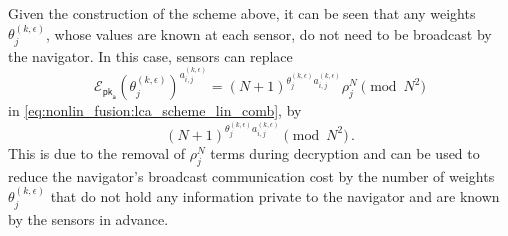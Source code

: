 \begin{remark}
    Given the construction of the scheme above, it can be seen that any weights $\theta^{(k,\epsilon)}_j$, whose values are known at each sensor, do not need to be broadcast by the navigator. In this case, sensors can replace
    \begin{equation}
        \mathcal{E}_{\mathsf{pk}_{\mathsf{a}}}(\theta^{(k,\epsilon)}_j)^{a^{(k,\epsilon)}_{i,j}} = (N+1)^{\theta^{(k,\epsilon)}_j a^{(k,\epsilon)}_{i,j}}\rho_j^N \pmod{N^2}
    \end{equation}
    in \eqref{eq:nonlin_fusion:lca_scheme_lin_comb}, by
    \begin{equation}
        (N+1)^{\theta^{(k,\epsilon)}_j a^{(k,\epsilon)}_{i,j}} \pmod{N^2}\,.
    \end{equation}
    This is due to the removal of $\rho_j^N$ terms during decryption and can be used to reduce the navigator's broadcast communication cost by the number of weights $\theta^{(k,\epsilon)}_j$ that do not hold any information private to the navigator and are known by the sensors in advance.
\end{remark}

% 
%                                                                                               
%                                                                                               
%                                                                                               
% 

